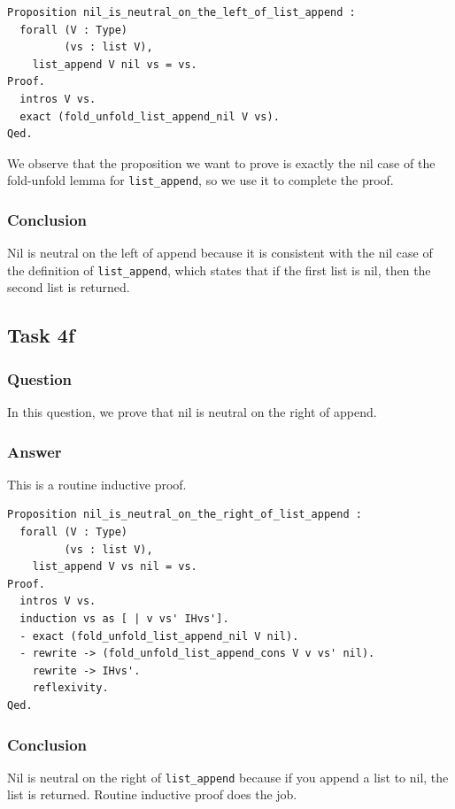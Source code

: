 \documentclass{article}
\begin{document}
\begin{lstlisting}
Proposition nil_is_neutral_on_the_left_of_list_append :
  forall (V : Type)
         (vs : list V),
    list_append V nil vs = vs.
Proof.
  intros V vs.
  exact (fold_unfold_list_append_nil V vs).
Qed.
\end{lstlisting}

We observe that the proposition we want to prove is exactly the nil case of the fold-unfold lemma for \texttt{list\_append}, so we use it to complete the proof.

\subsubsection{Conclusion}
Nil is neutral on the left of append because it is consistent with the nil case of the definition of \texttt{list\_append}, which states that if the first list is nil, then the second list is returned. 

\subsection{Task 4f}

\subsubsection{Question}
In this question, we prove that nil is neutral on the right of append.

\subsubsection{Answer}
This is a routine inductive proof.

\begin{lstlisting}
Proposition nil_is_neutral_on_the_right_of_list_append :
  forall (V : Type)
         (vs : list V),
    list_append V vs nil = vs.
Proof.
  intros V vs.
  induction vs as [ | v vs' IHvs'].
  - exact (fold_unfold_list_append_nil V nil).
  - rewrite -> (fold_unfold_list_append_cons V v vs' nil).
    rewrite -> IHvs'.
    reflexivity.
Qed.
\end{lstlisting}

\subsubsection{Conclusion}
Nil is neutral on the right of \texttt{list\_append} because if you append a list to nil, the list is returned. Routine inductive proof does the job.
\end{document}
